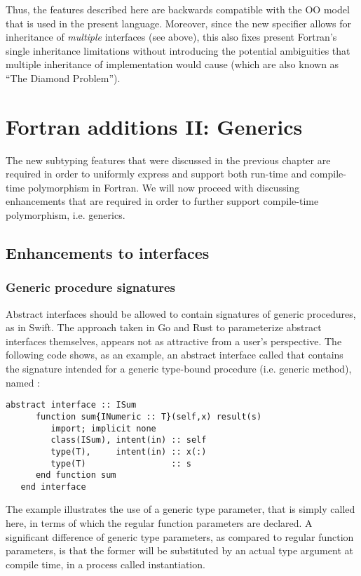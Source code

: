 \documentclass[11pt,oneside]{report}
\newcommand{\code}[1]{{\selectfont\ttfamily{#1}}}
\begin{document}
Thus, the features described here are backwards compatible with the OO
model that is used in the present language. Moreover, since the new
\code{implements} specifier allows for inheritance of \emph{multiple}
interfaces (see above), this also fixes present Fortran's single
inheritance limitations without introducing the potential ambiguities
that multiple inheritance of implementation would cause (which are
also known as ``The Diamond Problem'').


\chapter{Fortran additions II: Generics}

The new subtyping features that were discussed in the previous chapter
are required in order to uniformly express and support both run-time
and compile-time polymorphism in Fortran. We will now proceed with
discussing enhancements that are required in order to further support
compile-time polymorphism, i.e. generics.

\section{Enhancements to interfaces}

\subsection{Generic procedure signatures} 
\label{sect:generic_interfaces}

Abstract interfaces should be allowed to contain signatures of generic
procedures, as in Swift. The approach taken in Go and Rust to
parameterize abstract interfaces themselves, appears not as attractive
from a user's perspective. The following code shows, as an example, an
abstract interface called \code{ISum} that contains the signature
intended for a generic type-bound procedure (i.e. generic method),
named \code{sum}:
\begin{lstlisting}[language=LFortran,style=boxed]
   abstract interface :: ISum
      function sum{INumeric :: T}(self,x) result(s)
         import; implicit none
         class(ISum), intent(in) :: self
         type(T),     intent(in) :: x(:)
         type(T)                 :: s
      end function sum
   end interface
\end{lstlisting}

The example illustrates the use of a generic type parameter, that is
simply called \code{T} here, in terms of which the regular function
parameters are declared. A significant difference of generic type
parameters, as compared to regular function parameters, is that the
former will be substituted by an actual type argument at compile time,
in a process called instantiation.
\end{document}
